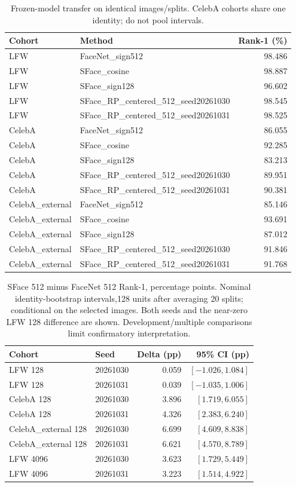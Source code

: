 \begin{table}[t]
\caption{Frozen-model transfer on identical images/splits. CelebA cohorts share one identity; do not pool intervals.}
\label{tab:v3transfer}\centering\small
\setlength{\tabcolsep}{3pt}
\begin{tabular}{llr}
\toprule
Cohort & Method & Rank-1 (\%) \\
\midrule
LFW & FaceNet\_sign512 & 98.486 \\
LFW & SFace\_cosine & 98.887 \\
LFW & SFace\_sign128 & 96.602 \\
LFW & SFace\_RP\_centered\_512\_seed20261030 & 98.545 \\
LFW & SFace\_RP\_centered\_512\_seed20261031 & 98.525 \\
CelebA & FaceNet\_sign512 & 86.055 \\
CelebA & SFace\_cosine & 92.285 \\
CelebA & SFace\_sign128 & 83.213 \\
CelebA & SFace\_RP\_centered\_512\_seed20261030 & 89.951 \\
CelebA & SFace\_RP\_centered\_512\_seed20261031 & 90.381 \\
CelebA\_external & FaceNet\_sign512 & 85.146 \\
CelebA\_external & SFace\_cosine & 93.691 \\
CelebA\_external & SFace\_sign128 & 87.012 \\
CelebA\_external & SFace\_RP\_centered\_512\_seed20261030 & 91.846 \\
CelebA\_external & SFace\_RP\_centered\_512\_seed20261031 & 91.768 \\
\bottomrule
\end{tabular}
\end{table}


\begin{table}[t]
\caption{SFace 512 minus FaceNet 512 Rank-1, percentage points. Nominal identity-bootstrap intervals,128 units after averaging 20 splits; conditional on the selected images. Both seeds and the near-zero LFW 128 difference are shown. Development/multiple comparisons limit confirmatory interpretation.}
\label{tab:v3pairedCI}\centering\small
\setlength{\tabcolsep}{3pt}
\begin{tabular}{llrr}
\toprule
Cohort & Seed & Delta (pp) &95\% CI (pp) \\
\midrule
LFW 128 & 20261030 & 0.059 & $[-1.026,1.084]$ \\
LFW 128 & 20261031 & 0.039 & $[-1.035,1.006]$ \\
CelebA 128 & 20261030 & 3.896 & $[1.719,6.055]$ \\
CelebA 128 & 20261031 & 4.326 & $[2.383,6.240]$ \\
CelebA\_external 128 & 20261030 & 6.699 & $[4.609,8.838]$ \\
CelebA\_external 128 & 20261031 & 6.621 & $[4.570,8.789]$ \\
LFW 4096 & 20261030 & 3.623 & $[1.729,5.449]$ \\
LFW 4096 & 20261031 & 3.223 & $[1.514,4.922]$ \\
\bottomrule
\end{tabular}
\end{table}

